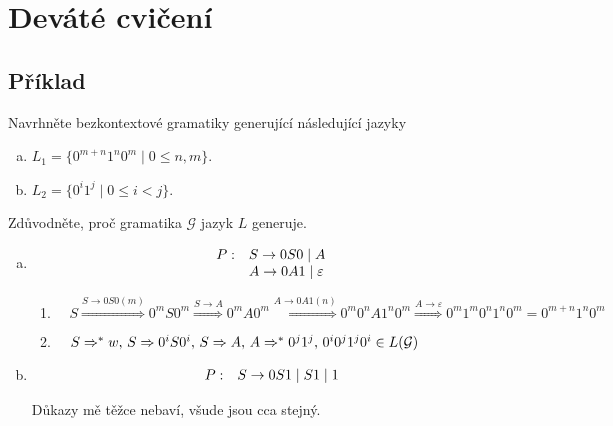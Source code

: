 \section{Deváté cvičení}
\subsection{Příklad}\noindent
Navrhněte bezkontextové gramatiky generující následující jazyky
\begin{enumerate}[a), noitemsep]
    \item $L_1 = \{0^{m+n} 1^n 0^m \mid 0 \leq n,m\}$.
    \item $L_2 = \{0^i 1^j \mid 0 \leq i < j\}$.
\end{enumerate}
Zdůvodněte, proč gramatika $\mathcal{G}$ jazyk $L$ generuje.

\begin{enumerate}[a)]
    \item 
\[
    \begin{array}{l l}
        P: & S \rightarrow 0S0 \mid A \\
        & A \rightarrow 0A1 \mid \varepsilon\\
    \end{array}
\]

\begin{enumerate}[noitemsep]
    \item $\quad S \stackrel{S \rightarrow 0S0 (m)}{\Longrightarrow} 0^m S 0^m \stackrel{S \rightarrow A}
    {\Longrightarrow} 0^m A 0^m \stackrel{A \rightarrow 0A1(n)}{\Longrightarrow} 0^m 0^n A 1^n 0^m \stackrel
    {A \rightarrow \varepsilon}{\Longrightarrow} 0^m 1^m 0^n 1^n 0^m = 0^{m+n}1^n0^m$
    \item $\quad S \Rightarrow^* w, \, S \Rightarrow 0^i S 0^i, \, S \Rightarrow A, \, A \Rightarrow^* 0^j 
    1^j, \, 0^i 0^j 1^j 0^i \in L(\mathcal{G})$
\end{enumerate}

\item 

\[
    \begin{array}{l l}
        P: & S \rightarrow 0S1 \mid S1 \mid 1 \\
    \end{array}
\]

Důkazy mě těžce nebaví, všude jsou cca stejný. 
\end{enumerate}

